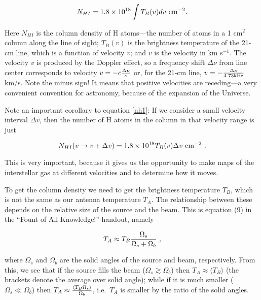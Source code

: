 \documentclass[psfig,preprint]{aastex}
\begin{document}
\begin{equation} \label{nh1}
N_{HI} = 1.8 \times 10^{18} \int T_{B}(v) dv \ {\rm cm^{-2}}. 
\end{equation}

\noindent Here $N_{HI}$ is the column density of H atoms---the number of
atoms in a 1 cm$^2$ column along the line of sight; $T_{B}(v)$ is the
brightness temperature of the 21-cm line, which is a function of 
velocity $v$; and $v$ is the velocity in km s$^{-1}$. The velocity $v$
is produced by the Doppler effect, so a frequency shift $\Delta \nu$
from line center corresponds to velocity $v = - c {\Delta \nu \over
\nu}$ or, for the 21-cm line, $v = -{\Delta \nu \over 4.73 {\rm kHz}}$ km/s.
Note the minus sign! It means that positive velocities are receding---a
very convenient convention for astronomy, because of the expansion of
the Universe. 

          Note an important corollary to equation \ref{nh1}: If we
consider a small velocity interval $\Delta v$, then the number of H
atoms in the column in that velocity range is just 

\begin{equation} \label{nh2}
N_{HI}(v \rightarrow v + \Delta v) = 1.8 \times 10^{18} T_{B}(v) \Delta
v \ {\rm cm^{-2}} \ .  
\end{equation}

\noindent This is very important, because it gives us the opportunity to
make maps of the interstellar gas at different velocities and to
determine how it moves.

	To get the column density we need to get the brightness
temperature $T_B$, which is not the same as our antenna temperature
$T_A$. The relationship between these depends on the relative size of
the source and the beam. This is equation (9) in the ``Fount of All
Knowledge!'' handout, namely 

\begin{equation} \label{taeqn}
T_A \approx T_B {\Omega_s \over \Omega_s + \Omega_b} \ ,
\end{equation}

\noindent where $\Omega_s$ and $\Omega_b$ are the solid angles of the
source and beam, respectively. From this, we see that if the source
fills the beam ($\Omega_s \gtrsim \Omega_b$) then $T_A \approx \langle
T_B\rangle$ (the brackets denote the average over solid angle);
while if it is much smaller ($\Omega_s \ll \Omega_b$) then $T_A \approx
{\langle T_B \Omega_s\rangle \over \Omega_b}$, i.e.\ $T_A$ is smaller by the ratio of
the solid angles. 
\end{document}
